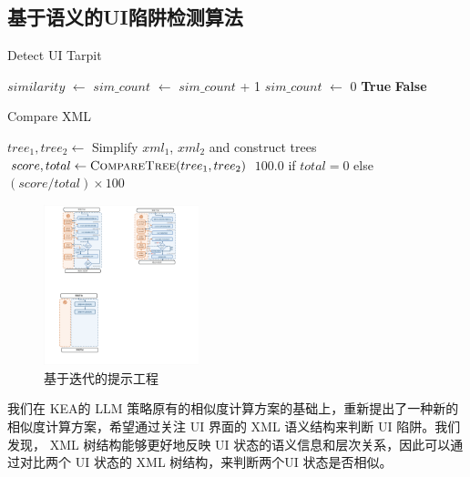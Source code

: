 \documentclass[twocolumn, 10pt]{article}
\newcommand{\kea}{K{\small\MakeUppercase{ea}}}
\begin{document}
\subsection{基于语义的UI陷阱检测算法}
\label{sec:semantic}

\begin{algorithm}[t]
\caption{Detect UI Tarpit}
\label{alg:detect_tarpit}
\begin{algorithmic}[1]
    \State $similarity$ $\gets$ 
    \State $sim\_count$ $\gets$ $sim\_count$ + 1
        \State $sim\_count$ $\gets$ 0
        \State \Return \textbf{True}
    \EndIf
\EndIf
\State \Return \textbf{False}
\EndFunction
\end{algorithmic}
\end{algorithm}

\begin{algorithm}[t]
\caption{Compare XML}
\label{alg:compare_xml}
\begin{algorithmic}[1]
    \State $tree_1, tree_2 \gets$ Simplify $xml_1$, $xml_2$ and construct trees
    \State $score, total \gets \Call{CompareTree}{tree_1, tree_2}$
    \State \Return $100.0$ if $total = 0$ else $(score / total) \times 100$
\EndFunction
\end{algorithmic}
\end{algorithm}

\begin{figure}[t]
    \centering
    \includegraphics[width=0.4\textwidth]{pic}
    \caption{基于迭代的提示工程}
    \label{fig:process}
\end{figure}

我们在 \kea 的 LLM 策略原有的相似度计算方案的基础上，重新提出了一种新的相似度计算方案，希望通过关注 UI 界面的 XML 语义结构来判断 UI 陷阱。我们发现， XML 树结构能够更好地反映 UI 状态的语义信息和层次关系，因此可以通过对比两个 UI 状态的 XML 树结构，来判断两个UI 状态是否相似。
\end{document}
